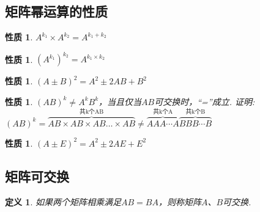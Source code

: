\documentclass[12pt, a4paper, oneside]{ctexbook}
\newtheorem{definition}[theorem]{定义}
\newtheorem{quolity}[theorem]{性质}
\begin{document}
\subsection{矩阵幂运算的性质}

\begin{quolity}
    $A^{k_1} \times A^{k_2} = A^{k_1 + k_2}$
\end{quolity}

\begin{quolity}
    $(A^{k_1})^{k_2} = A^{k_1 \times k_2}$
\end{quolity}

\begin{quolity}
    $(A \pm B)^2 = A^2 \pm 2AB + B^2$
\end{quolity}

\begin{quolity}
    $(AB)^k \neq A^kB^k$，当且仅当$AB$可交换时，``=''成立. 
    \newline
    证明: $(AB)^k = \overbrace{AB \times AB \times AB \dots \times AB}^{\mbox{共k个AB}} \neq \overbrace{AAA \cdots A}^{\mbox{共k个A}} \overbrace{BBB \cdots B}^{\mbox{共k个B}}$
\end{quolity}

\begin{quolity}
    $(A \pm E)^2 = A^2 \pm 2AE + E^2$
\end{quolity}

\subsection{矩阵可交换}

\begin{definition}
    如果两个矩阵相乘满足$AB = BA$，则称矩阵$A$、$B$可交换. 
\end{definition}
\end{document}

